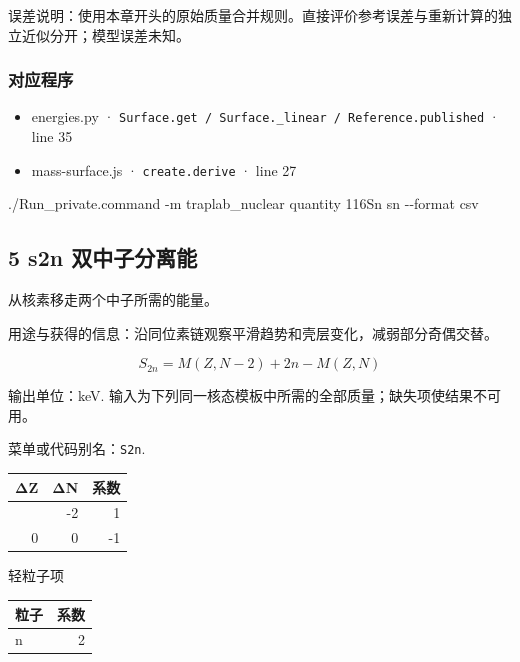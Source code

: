 \documentclass[
  11pt,
  letterpaper,
]{article}
\newenvironment{Shaded}{}{}
\newcommand{\AttributeTok}[1]{\textcolor[rgb]{0.49,0.56,0.16}{#1}}
\newcommand{\ExtensionTok}[1]{#1}
\newcommand{\NormalTok}[1]{#1}
\providecommand{\tightlist}{%
  \setlength{\itemsep}{0pt}\setlength{\parskip}{0pt}}
\begin{document}
误差说明：使用本章开头的原始质量合并规则。直接评价参考误差与重新计算的独立近似分开；模型误差未知。

\subsubsection{对应程序}\label{ux5bf9ux5e94ux7a0bux5e8f-3}

\begin{itemize}
\tightlist
\item
  energies.py ·
  \texttt{Surface.get\ /\ Surface.\_linear\ /\ Reference.published} ·
  line 35
\item
  mass-surface.js · \texttt{create.derive} · line 27
\end{itemize}

\begin{Shaded}
\begin{Highlighting}[]
\ExtensionTok{./Run\_private.command} \AttributeTok{{-}m}\NormalTok{ traplab\_nuclear quantity 116Sn sn }\AttributeTok{{-}{-}format}\NormalTok{ csv}
\end{Highlighting}
\end{Shaded}

\subsection{5 s2n
双中子分离能}\label{s2n-ux53ccux4e2dux5b50ux5206ux79bbux80fd}

从核素移走两个中子所需的能量。

用途与获得的信息：沿同位素链观察平滑趋势和壳层变化，减弱部分奇偶交替。

\[
S_{2n}=M(Z,N-2)+2n-M(Z,N)
\]

输出单位：keV.
输入为下列同一核态模板中所需的全部质量；缺失项使结果不可用。

菜单或代码别名：\texttt{S2n}.

\begin{longtable}[]{@{}rrr@{}}
\toprule\noalign{}
ΔZ & ΔN & 系数 \\
\midrule\noalign{}
\endhead
\bottomrule\noalign{}
\endlastfoot
0 & -2 & 1 \\
0 & 0 & -1 \\
\end{longtable}

轻粒子项

\begin{longtable}[]{@{}lr@{}}
\toprule\noalign{}
粒子 & 系数 \\
\midrule\noalign{}
\endhead
\bottomrule\noalign{}
\endlastfoot
n & 2 \\
\end{longtable}
\end{document}
